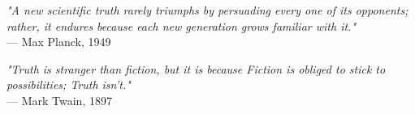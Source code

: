 \begin{flushright}
\emph{"A new scientific truth rarely triumphs by persuading every one of its opponents; rather, it endures because each new generation grows familiar with it."}\\
— Max Planck, 1949
\end{flushright}
\vspace{2em}
\begin{flushright}
\emph{"Truth is stranger than fiction, but it is because Fiction is obliged to stick to possibilities; Truth isn't."}\\
— Mark Twain, 1897
\end{flushright}
